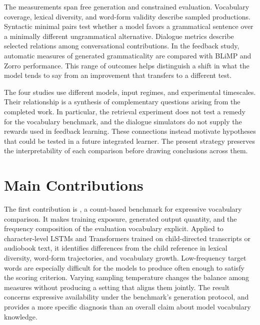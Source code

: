 The measurements span free generation and constrained evaluation. Vocabulary coverage, lexical diversity, and word-form validity describe sampled productions. Syntactic minimal pairs test whether a model favors a grammatical sentence over a minimally different ungrammatical alternative. Dialogue metrics describe selected relations among conversational contributions. In the feedback study, automatic measures of generated grammaticality are compared with BLiMP and Zorro performance. This range of outcomes helps distinguish a shift in what the model tends to say from an improvement that transfers to a different test.

The four studies use different models, input regimes, and experimental timescales. Their relationship is a synthesis of complementary questions arising from the completed work. In particular, the retrieval experiment does not test a remedy for the vocabulary benchmark, and the dialogue simulators do not supply the rewards used in feedback learning. These connections instead motivate hypotheses that could be tested in a future integrated learner. The present strategy preserves the interpretability of each comparison before drawing conclusions across them.

\section{Main Contributions}
\label{sec:intro:contributions}

The first contribution is \meCDI{}, a count-based benchmark for expressive vocabulary comparison. It makes training exposure, generated output quantity, and the frequency composition of the evaluation vocabulary explicit. Applied to character-level LSTMs and Transformers trained on child-directed transcripts or audiobook text, it identifies differences from the child reference in lexical diversity, word-form trajectories, and vocabulary growth. Low-frequency target words are especially difficult for the models to produce often enough to satisfy the scoring criterion. Varying sampling temperature changes the balance among measures without producing a setting that aligns them jointly. The result concerns expressive availability under the benchmark's generation protocol, and provides a more specific diagnosis than an overall claim about model vocabulary knowledge.

